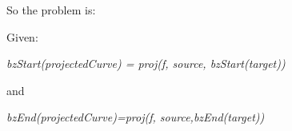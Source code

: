 \documentclass{article}
\begin{document}
\begin{Maple Normal}{
\begin{Maple Normal}{
}\end{Maple Normal}
}\end{Maple Normal}
\begin{Maple Normal}{
\begin{Maple Normal}{
So the problem is:}\end{Maple Normal}

}\end{Maple Normal}

\begin{Maple Normal}{
\begin{Maple Normal}{
}\end{Maple Normal}
}\end{Maple Normal}
\begin{Maple Normal}{
\begin{Maple Normal}{
Given:}\end{Maple Normal}

}\end{Maple Normal}

\begin{Maple Normal}{
\begin{Maple Normal}{
}\end{Maple Normal}
}\end{Maple Normal}
\begin{Maple Normal}{
\begin{Maple Normal}{
\textit{bzStart(projectedCurve) = proj(f, source, bzStart(target))}}\end{Maple Normal}

}\end{Maple Normal}

\begin{Maple Normal}{
\begin{Maple Normal}{
\textit{}}\end{Maple Normal}
}\end{Maple Normal}
\begin{Maple Normal}{
\begin{Maple Normal}{
and}\end{Maple Normal}

}\end{Maple Normal}

\begin{Maple Normal}{
\begin{Maple Normal}{
}\end{Maple Normal}
}\end{Maple Normal}
\begin{Maple Normal}{
\begin{Maple Normal}{
\textit{bzEnd(projectedCurve)=proj(f, source,bzEnd(target))}}\end{Maple Normal}

}\end{Maple Normal}
\end{document}
